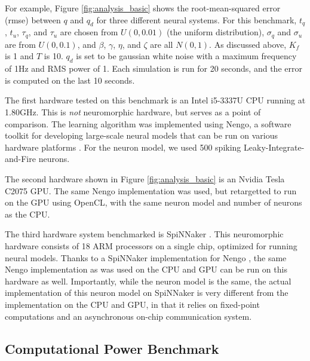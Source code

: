 \documentclass{frontiersSCNS} %
\begin{document}
For example, Figure \ref{fig:analysis_basic} shows the root-mean-squared
error (rmse) between $q$ and $q_d$ for three different neural systems.  For
this benchmark, $t_q$, $t_u$, $\tau_q$, and $\tau_u$ are chosen from $U(0, 0.01)$ (the uniform distribution), $\sigma_q$ and $\sigma_u$ are from $U(0, 0.1)$,
and $\beta$, $\gamma$, $\eta$, and $\zeta$ are all $N(0, 1)$.  As discussed
above, $K_f$ is 1 and $T$ is 10.  $q_d$ is set to be gaussian white noise with
a maximum frequency of 1Hz and RMS power of 1.  Each simulation is run
for 20 seconds, and the error is computed on the last 10 seconds.

The first hardware tested on this benchmark is an Intel i5-3337U CPU running
at 1.80GHz.  This is \emph{not} neuromorphic hardware, but serves as a
point of comparison.  The learning algorithm was implemented using Nengo,
a software toolkit for developing large-scale neural models that can be run
on various hardware platforms \cite{nengo}.  For the neuron model, we used
500 spiking Leaky-Integrate-and-Fire neurons.

The second hardware shown in Figure \ref{fig:analysis_basic} is an
Nvidia Tesla C2075 GPU.  The same Nengo implementation was used, but
retargetted to run on the GPU using OpenCL, with the same neuron model and
number of neurons as the CPU.

The third hardware system benchmarked is SpiNNaker \cite{furber2014}.  This
neuromorphic hardware consists of 18 ARM processors on a single chip, 
optimized for running neural models.  Thanks to a SpiNNaker implementation
for Nengo \cite{mundy2015}, the same Nengo implementation as was used on the
CPU and GPU can be run on this hardware as well.  Importantly, while the
neuron model is the same, the actual implementation of this neuron model on
SpiNNaker is very different from the implementation on the CPU and GPU, in
that it relies on fixed-point computations and an asynchronous on-chip
communication system.

\subsection{Computational Power Benchmark}
\end{document}
